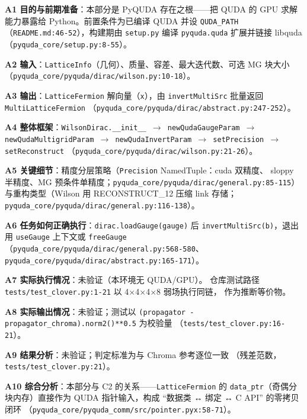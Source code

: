 \documentclass[UTF8]{ctexart}
\begin{document}
\textbf{A1 目的与前期准备}：本部分是 PyQUDA 存在之根——把 QUDA 的 GPU 求解能力暴露给
Python。前置条件为已编译 QUDA 并设 \texttt{QUDA\_PATH}
（\texttt{\nolinkurl{README.md:46-52}}），构建期由 \texttt{setup.py} 编译
\texttt{pyquda.quda} 扩展并链接 libquda（\texttt{\nolinkurl{pyquda_core/setup.py:8-55}}）。

\textbf{A2 输入}：\texttt{LatticeInfo}（几何）、质量、容差、最大迭代数、可选 MG 块大小
（\texttt{\nolinkurl{pyquda_core/pyquda/dirac/wilson.py:10-18}}）。

\textbf{A3 输出}：\texttt{LatticeFermion} 解向量（\texttt{x}），由
\texttt{invertMultiSrc} 批量返回 \texttt{MultiLatticeFermion}
（\texttt{\nolinkurl{pyquda_core/pyquda/dirac/abstract.py:247-252}}）。

\textbf{A4 整体框架}：\texttt{WilsonDirac.\_\_init\_\_  $\rightarrow$  newQudaGaugeParam  $\rightarrow$ 
newQudaMultigridParam  $\rightarrow$  newQudaInvertParam  $\rightarrow$  setPrecision  $\rightarrow$  setReconstruct}
（\texttt{\nolinkurl{pyquda_core/pyquda/dirac/wilson.py:21-26}}）。

\textbf{A5 关键细节}：精度分层策略（\texttt{Precision} NamedTuple：cuda 双精度、
sloppy 半精度、MG 预条件单精度；\texttt{\nolinkurl{pyquda_core/pyquda/dirac/general.py:85-115}}）
与重构类型（Wilson 用 RECONSTRUCT\_12 压缩 link 存储；
\texttt{\nolinkurl{pyquda_core/pyquda/dirac/general.py:116-138}}）。

\textbf{A6 任务如何正确执行}：\texttt{dirac.loadGauge(gauge)} 后
\texttt{invertMultiSrc(b)}，退出用 \texttt{useGauge} 上下文或 \texttt{freeGauge}
（\texttt{\nolinkurl{pyquda_core/pyquda/dirac/general.py:568-580}}、
\texttt{\nolinkurl{pyquda_core/pyquda/dirac/abstract.py:165-171}}）。

\textbf{A7 实际执行情况}：\textcolor{warn}{未验证}（本环境无 QUDA/GPU）。
仓库测试路径 \texttt{tests/test\_clover.py:1-21} 以 4$\times$4$\times$4$\times$8 弱场执行同链，
作为\textcolor{phys}{推断}等价物。

\textbf{A8 实际输出情况}：\textcolor{warn}{未验证}；测试以
\texttt{(propagator - propagator\_chroma).norm2()**0.5} 为校验量
（\texttt{\nolinkurl{tests/test_clover.py:16-21}}）。

\textbf{A9 结果分析}：\textcolor{warn}{未验证}；判定标准为与 Chroma 参考逐位一致
（残差范数，\texttt{\nolinkurl{tests/test_clover.py:21}}）。

\textbf{A10 综合分析}：本部分与 C2 的关系——\texttt{LatticeFermion} 的
\texttt{data\_ptr}（奇偶分块内存）直接作为 QUDA 指针输入，构成
“数据类 ↔ 绑定 ↔ C API” 的零拷贝闭环
（\texttt{\nolinkurl{pyquda_core/pyquda_comm/src/pointer.pyx:58-71}}）。
\end{document}
